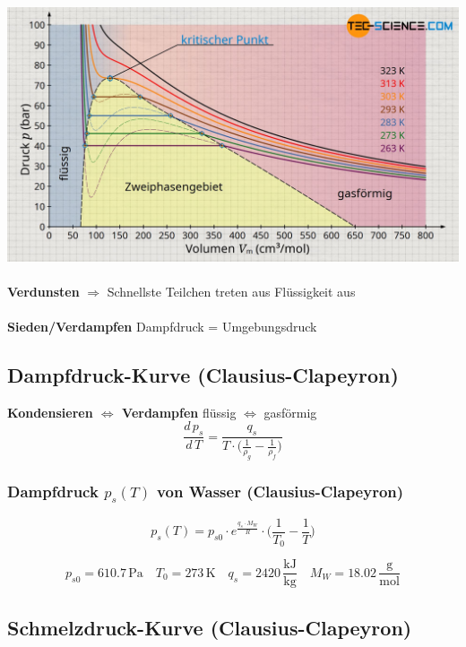 \includegraphics[width=0.9\linewidth]{Bilder/dampfdruck} \\
\\
\textbf{Verdunsten} $\Rightarrow$ Schnellste Teilchen treten aus Flüssigkeit aus \\
\\
\textbf{Sieden/Verdampfen} Dampfdruck = Umgebungsdruck



\vfill\null
\columnbreak



\subsection{Dampfdruck-Kurve (Clausius-Clapeyron)}

\textbf{Kondensieren $\Leftrightarrow$ Verdampfen}  \qquad flüssig $\Leftrightarrow$ gasförmig  \\

$$ \boxed{ \frac{d \, p_s}{d\, T} = \frac{q_s}{T \cdot  \Big( \frac{1}{\rho_g} - \frac{1}{\rho_f} \Big)  }     } $$



\subsubsection{Dampfdruck $p_s(T)$ von Wasser (Clausius-Clapeyron)}

$$ \boxed{ p_s(T) = p_{s0} \cdot e^{\frac{q_s \cdot M_W}{R}} \cdot \Big( \frac{1}{T_0} - \frac{1}{T} \Big)   } $$

$$ p_{s0} = 610.7 \, \mathrm{Pa} \quad T_0 = 273 \, \mathrm{K} \quad q_s = 2420 \, \mathrm{\frac{kJ}{kg}} \quad M_W = 18.02 \, \mathrm{\frac{g}{mol}}  $$



\subsection{Schmelzdruck-Kurve (Clausius-Clapeyron)}

